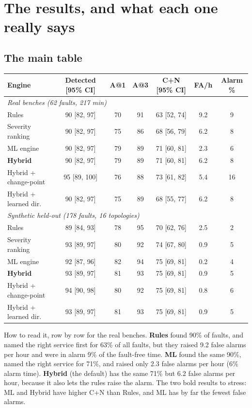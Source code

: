 \chapter{The results, and what each one really says}
\label{ch:results}

\section{The main table}
\begin{center}
\scriptsize
\setlength{\tabcolsep}{3pt}
\begin{tabular}{lcccccc}
\toprule
Engine & Detected [95\% CI] & A@1 & A@3 & C+N [95\% CI] & FA/h & Alarm \%\\
\midrule
\multicolumn{7}{l}{\textit{Real benches (62 faults, 217 min)}}\\
Rules & 90 [82, 97] & 70 & 91 & 63 [52, 74] & 9.2 & 9\\
Severity ranking & 90 [82, 97] & 75 & 86 & 68 [56, 79] & 6.2 & 8\\
ML engine & 90 [82, 97] & 79 & 89 & 71 [60, 81] & 2.3 & 6\\
\textbf{Hybrid} & 90 [82, 97] & 79 & 89 & 71 [60, 81] & 6.2 & 8\\
Hybrid + change-point & 95 [89, 100] & 76 & 88 & 73 [61, 82] & 5.4 & 16\\
Hybrid + learned dir. & 90 [82, 97] & 75 & 89 & 68 [55, 77] & 6.2 & 8\\
\midrule
\multicolumn{7}{l}{\textit{Synthetic held-out (178 faults, 16 topologies)}}\\
Rules & 89 [84, 93] & 78 & 95 & 70 [62, 76] & 2.5 & 2\\
Severity ranking & 93 [89, 97] & 80 & 92 & 74 [67, 80] & 0.9 & 5\\
ML engine & 92 [87, 96] & 82 & 94 & 75 [69, 81] & 0.2 & 4\\
\textbf{Hybrid} & 93 [89, 97] & 81 & 93 & 75 [69, 81] & 0.9 & 5\\
Hybrid + change-point & 94 [90, 98] & 80 & 92 & 75 [69, 81] & 0.8 & 6\\
Hybrid + learned dir. & 93 [89, 97] & 81 & 93 & 75 [69, 81] & 0.9 & 5\\
\bottomrule
\end{tabular}
\end{center}

\begin{simplebox}
How to read it, row by row for the real benches. \textbf{Rules} found 90\% of faults, and named the right service first for 63\% of all faults, but they raised 9.2 false alarms per hour and were in alarm 9\% of the fault-free time. \textbf{ML} found the same 90\%, named the right service for 71\%, and raised only 2.3 false alarms per hour (6\% alarm time). \textbf{Hybrid} (the default) has the same 71\% but 6.2 false alarms per hour, because it also lets the rules raise the alarm. The two bold results to stress: ML and Hybrid have higher C+N than Rules, and ML has by far the fewest false alarms.
\end{simplebox}

